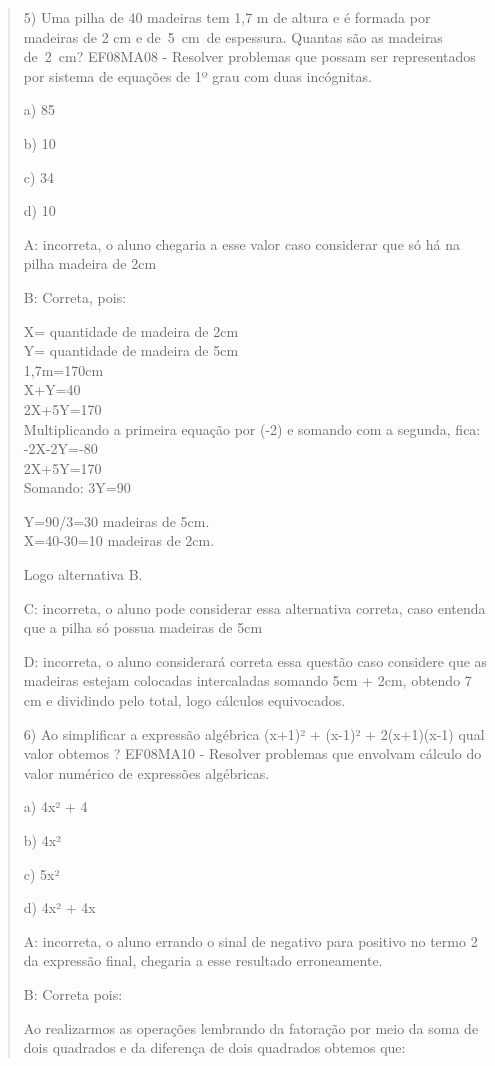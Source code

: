 \begin{quote}
\begin{escolha}
5) Uma pilha de 40 madeiras tem 1,7 m de altura e é formada por madeiras
de 2 cm e de~5~cm~de espessura. Quantas são as madeiras de~2~cm?
EF08MA08 - Resolver problemas que possam ser representados por sistema
de equações de 1º grau com duas incógnitas.

a) 85

b) 10

c) 34

d) 10

A: incorreta, o aluno chegaria a esse valor caso considerar que só há na
pilha madeira de 2cm

B: Correta, pois:

X= quantidade de madeira de 2cm\\
Y= quantidade de madeira de 5cm\\
1,7m=170cm\\
X+Y=40\\
2X+5Y=170\\
Multiplicando a primeira equação por (-2) e somando com a segunda,
fica:\\
-2X-2Y=-80\\
2X+5Y=170\\
Somando: 3Y=90

Y=90/3=30 madeiras de 5cm.\\
X=40-30=10 madeiras de 2cm.

Logo alternativa B.

C: incorreta, o aluno pode considerar essa alternativa correta, caso
entenda que a pilha só possua madeiras de 5cm

D: incorreta, o aluno considerará correta essa questão caso considere
que as madeiras estejam colocadas intercaladas somando 5cm + 2cm,
obtendo 7 cm e dividindo pelo total, logo cálculos equivocados.

6) Ao simplificar a expressão algébrica (x+1)² + (x-1)² + 2(x+1)(x-1)
qual valor obtemos ? EF08MA10 - Resolver problemas que envolvam cálculo
do valor numérico de expressões algébricas.

a) 4x² + 4

b) 4x²

c) 5x²

d) 4x² + 4x

A: incorreta, o aluno errando o sinal de negativo para positivo no termo
2 da expressão final, chegaria a esse resultado erroneamente.

B: Correta pois:

Ao realizarmos as operações lembrando da fatoração por meio da soma de
dois quadrados e da diferença de dois quadrados obtemos que:


\end{escolha}
\end{quote}
